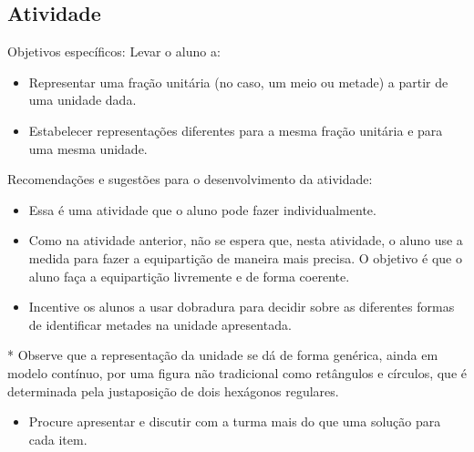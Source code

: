 \documentclass[a4paper,12pt,twoside]{book}
\begin{document}
\subsection{Atividade}




\begin{professor*}[breakable]{}{}  
  
  Objetivos específicos: Levar o aluno a:  
\begin{itemize} %
    \item       Representar uma fração unitária (no caso, um meio ou metade) a partir de uma unidade dada.  
    \item       Estabelecer representações diferentes para a mesma fração unitária e para uma mesma unidade.
\end{itemize} %
  
  
  Recomendações e sugestões para o desenvolvimento da atividade:  
\begin{itemize} %
    \item       Essa é uma atividade que o aluno pode fazer individualmente. 
    \item       Como na atividade anterior, não se espera que, nesta atividade, o aluno use a medida para fazer a equipartição de maneira mais precisa. O objetivo é que o aluno faça a equipartição livremente e de forma coerente. 
    \item       Incentive os alunos a usar dobradura para decidir sobre as diferentes formas de identificar metades na unidade apresentada.
\end{itemize} %
  
  * Observe que a representação da unidade se dá de forma genérica, ainda em modelo contínuo, por uma figura não tradicional como retângulos e círculos, que é determinada pela justaposição de dois hexágonos regulares.  
\begin{itemize} %
    \item       Procure apresentar e discutir com a turma mais do que uma solução para cada item.
\end{itemize} %
  
\end{professor*}
\end{document}
